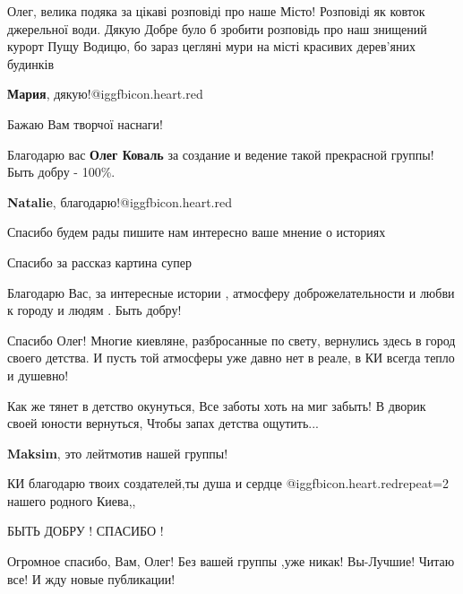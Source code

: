 \begin{itemize}

Олег, велика подяка за цікаві розповіді про наше Місто! Розповіді як ковток
джерельної води. Дякую Добре було б зробити розповідь про наш знищений курорт
Пущу Водицю, бо зараз цегляні мури на місті красивих дерев'яних будинків

\begin{itemize} %
\textbf{Мария}, дякую!@igg{fbicon.heart.red}
\end{itemize} %

Бажаю Вам творчої наснаги!

Благодарю вас \textbf{Олег Коваль} за создание и ведение такой прекрасной группы!
Быть добру - 100\%.

\begin{itemize} %
\textbf{Natalie}, благодарю!@igg{fbicon.heart.red}
\end{itemize} %

Спасибо будем рады пишите нам интересно ваше мнение о историях

Спасибо за рассказ картина супер

Благодарю Вас, за интересные истории , атмосферу доброжелательности и любви к городу и людям .
Быть добру!


Спасибо Олег! Многие киевляне, разбросанные по свету, вернулись здесь в город
своего детства. И пусть той атмосферы уже давно нет в реале, в КИ всегда тепло
и душевно!



\obeycr
Как же тянет в детство окунуться,
Все заботы хоть на миг забыть!
В дворик своей юности вернуться,
Чтобы запах детства ощутить...
\restorecr

\begin{itemize} %
\textbf{Maksim}, это лейтмотив нашей группы!
\end{itemize} %

КИ благодарю твоих создателей,ты душа и сердце @igg{fbicon.heart.red}{repeat=2}
нашего родного Киева,,

 БЫТЬ ДОБРУ !  СПАСИБО !

 Огромное спасибо, Вам, Олег! Без вашей группы ,уже
никак! Вы-Лучшие! Читаю все! И жду новые публикации!


\end{itemize}
